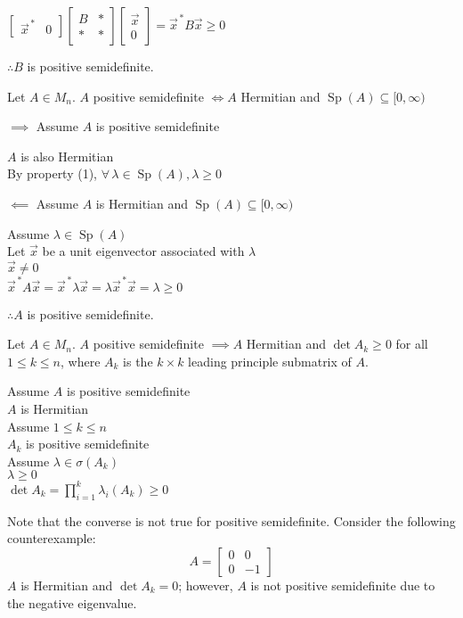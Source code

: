 \documentclass[letterpaper,12pt,fleqn]{article}
\newcommand{\vx}{\vec{x}}
\newcommand{\vxct}{\vx^{\,*}}
\renewcommand{\l}{\lambda}
\renewcommand{\o}{\sigma}
\DeclareMathOperator{\Sp}{Sp}
\begin{document}
\begin{properties}
\begin{enumerate}
    $\begin{bmatrix} \vxct & 0 \end{bmatrix}
    \left[\begin{array}{c|c} B & * \\ \hline * & * \end{array}\right]
    \begin{bmatrix} \vx \\ 0 \end{bmatrix}=\vxct B\vx\ge0$

    $\therefore B$ is positive semidefinite.
  \end{enumerate}
\end{properties}

\begin{theorem}
  Let $A\in M_n$. $A$ positive semidefinite $\iff A$ Hermitian and
  $\Sp(A)\subseteq[0,\infty)$
\end{theorem}

\newpage

\begin{theproof}
  \listbreak
  \begin{description}
  \item $\implies$ Assume $A$ is positive semidefinite

    $A$ is also Hermitian \\
    By property (1), $\forall\,\l\in\Sp(A),\l\ge0$

  \item $\impliedby$ Assume $A$ is Hermitian and $\Sp(A)\subseteq[0,\infty)$

    Assume $\l\in\Sp(A)$ \\
    Let $\vx$ be a unit eigenvector associated with $\l$ \\
    $\vx\ne 0$ \\
    $\vxct A\vx=\vxct\l\vx=\l\vxct\vx=\l\ge0$

    $\therefore A$ is positive semidefinite.
  \end{description}
\end{theproof}

\begin{theorem}
  Let $A\in M_n$. $A$ positive semidefinite $\implies A$ Hermitian and
  $\det A_k\ge0$ for all $1\le k\le n$, where $A_k$ is the $k\times k$ leading
  principle submatrix of $A$.
\end{theorem}

\begin{theproof}
  Assume $A$ is positive semidefinite \\
  $A$ is Hermitian \\
  Assume $1\le k\le n$ \\
  $A_k$ is positive semidefinite \\
  Assume $\l\in\o(A_k)$ \\
  $\l\ge0$ \\
  $\det A_k=\prod_{i=1}^k\l_i(A_k)\ge0$
\end{theproof}

Note that the converse is not true for positive semidefinite. Consider the following
counterexample:
\[A=\begin{bmatrix} 0 & 0 \\ 0 & -1 \end{bmatrix}\]
$A$ is Hermitian and $\det A_k=0$; however, $A$ is not positive semidefinite due to the
negative eigenvalue.
\end{document}

